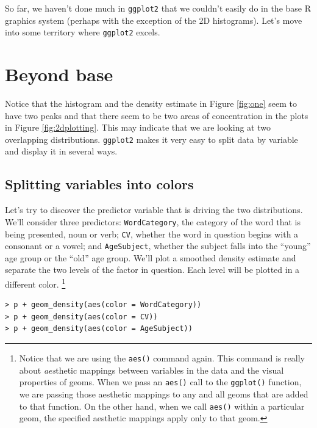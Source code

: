 \documentclass[oneside, 10pt]{article}
\begin{document}
So far, we haven't done much in \verb!ggplot2! that we couldn't easily do in the base R graphics system (perhaps with the exception of the 2D histograms). Let's move into some territory where \verb!ggplot2! excels.

\section{Beyond base}

Notice that the histogram and the density estimate in Figure \ref{fig:one} seem to have two peaks and that there seem to be two areas of concentration in the plots in Figure \ref{fig:2dplotting}. This may indicate that we are looking at two overlapping distributions. \verb!ggplot2! makes it very easy to split data by variable and display it in several ways.

\subsection{Splitting variables into colors}

Let's try to discover the predictor variable that is driving the two distributions. We'll consider three predictors: \verb!WordCategory!, the category of the word that is being presented, noun or verb; \verb!CV!, whether the word in question begins with a consonant or a vowel; and \verb!AgeSubject!, whether the subject falls into the ``young'' age group or the ``old'' age group. We'll plot a smoothed density estimate and separate the two levels of the factor in question. Each level will be plotted in a different color. \footnote{Notice that we are using the \texttt{aes()} command again. This command is really about \emph{aes}thetic mappings between variables in the data and the visual properties of geoms. When we pass an \texttt{aes()} call to the \texttt{ggplot()} function, we are passing those aesthetic mappings to any and all geoms that are added to that function. On the other hand, when we call \texttt{aes()} within a particular geom, the specified aesthetic mappings apply only to that geom.}

\begin{verbatim}
> p + geom_density(aes(color = WordCategory)) 
> p + geom_density(aes(color = CV))
> p + geom_density(aes(color = AgeSubject))
\end{verbatim}
\end{document}
